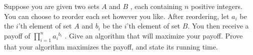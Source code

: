 \problem{}
Suppose you are given two sets  $A$  and  $B$ , each containing  $n$  positive integers. You can choose to reorder each set however you like. After reordering, let  $a_{i}$  be the  $i$'th element of set  $A$  and $b_{i}$  be the  $i$'th element of set  $B$. You then receive a payoff of  $\prod_{i=1}^{n} a_{i}{ }^{b_{i}}$ . Give an algorithm that will maximize your payoff. Prove that your algorithm maximizes the payoff, and state its running time.

\solution{

}


\newpage